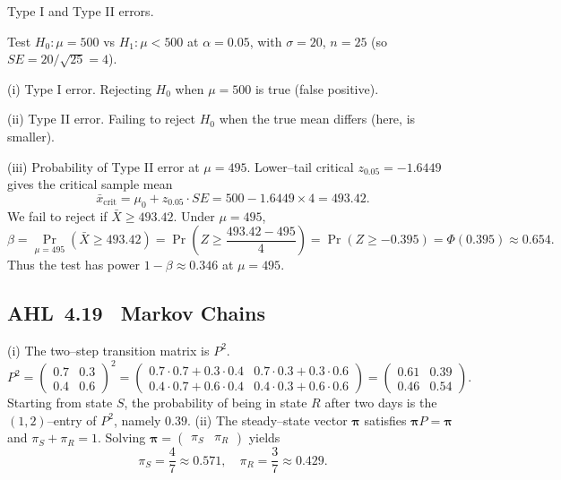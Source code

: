 \documentclass[11pt]{article}
\def\textbf#1{#1}%
\def\mathrm#1{#1}%
\newcommand{\tocsubsection}[1]{\subsection{#1}}
\begin{document}

\begin{solution}
\textbf{Type I and Type II errors.}

Test $H_0:\mu=500$ vs $H_1:\mu<500$ at $\alpha=0.05$, with $\sigma=20$, $n=25$ (so $\mathrm{SE}=20/\sqrt{25}=4$).

\textbf{(i) Type I error.} Rejecting $H_0$ when $\mu=500$ is true (false positive).

\textbf{(ii) Type II error.} Failing to reject $H_0$ when the true mean differs (here, is smaller). 

\textbf{(iii) Probability of Type II error at $\mu=495$.}
Lower–tail critical $z_{0.05}=-1.6449$ gives the critical sample mean
\[
\bar x_{\text{crit}}=\mu_0+z_{0.05}\cdot \mathrm{SE}
=500-1.6449\times 4=\boxed{493.42}.
\]
We fail to reject if $\bar X\ge 493.42$. Under $\mu=495$,
\[
\beta=\Pr_{\mu=495}(\bar X\ge 493.42)
= \Pr\!\left(Z\ge \frac{493.42-495}{4}\right)
=\Pr(Z\ge -0.395)=\Phi(0.395)\approx \boxed{0.654}.
\]
Thus the test has power $1-\beta\approx \boxed{0.346}$ at $\mu=495$.
\end{solution}



\tocsubsection{AHL 4.19 \; Markov Chains}

\begin{solution}
(i) The two–step transition matrix is $P^2$.
\[P^2=\begin{pmatrix}0.7&0.3\\0.4&0.6\end{pmatrix}^2
  =\begin{pmatrix}0.7\cdot0.7+0.3\cdot0.4 & 0.7\cdot0.3+0.3\cdot0.6\\
                 0.4\cdot0.7+0.6\cdot0.4 & 0.4\cdot0.3+0.6\cdot0.6
    \end{pmatrix}
  =\begin{pmatrix}0.61 & 0.39\\0.46 & 0.54\end{pmatrix}.
\]
Starting from state $S$, the probability of being in state $R$ after two
days is the $(1,2)$–entry of $P^2$, namely $0.39$.  (ii) The steady–state
vector $\boldsymbol{\pi}$ satisfies $\boldsymbol{\pi}P=\boldsymbol{\pi}$ and
$\pi_S+\pi_R=1$.  Solving
$\boldsymbol{\pi}=\begin{pmatrix}\pi_S & \pi_R\end{pmatrix}$ yields
\[\pi_S=\frac{4}{7}\approx0.571,\quad\pi_R=\frac{3}{7}\approx0.429.
\]
\end{solution}
\end{document}
